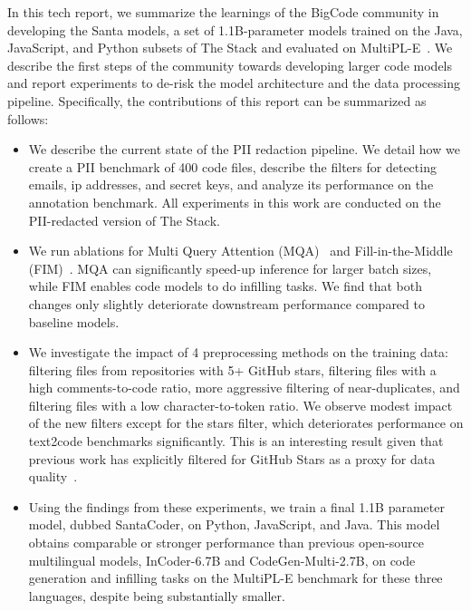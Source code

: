 \documentclass[10pt]{article} \usepackage{iclr2023_conference,times}
\begin{document}
In this tech report, we summarize the learnings of the BigCode community in developing the Santa models, a set of 1.1B-parameter models trained on the Java, JavaScript, and Python subsets of The Stack and evaluated on MultiPL-E~\citep{cassano2022multiple}. We describe the first steps of the community towards developing larger code models and report experiments to de-risk the model architecture and the data processing pipeline. Specifically, the contributions of this report can be summarized as follows:
\begin{itemize}
    \item We describe the current state of the PII redaction pipeline. We detail how we create a PII benchmark of 400 code files, describe the filters for detecting emails, ip addresses, and secret keys, and analyze its performance on the annotation benchmark. All experiments in this work are conducted on the PII-redacted version of The Stack.  
    \item We run ablations for Multi Query Attention (MQA)~\citep{shazeer2019mqa,chowdhery2022palm,li2022competition} and Fill-in-the-Middle (FIM)~\citep{fried2022incoder,bavarian2022fim}. MQA can significantly speed-up inference for larger batch sizes, while FIM enables code models to do infilling tasks. We find that both changes only slightly deteriorate downstream performance compared to baseline models. 
    \item We investigate the impact of 4 preprocessing methods on the training data: filtering files from repositories with 5+ GitHub stars, filtering files with a high comments-to-code ratio, more aggressive filtering of near-duplicates, and filtering files with a low character-to-token ratio. We observe modest impact of the new filters except for the stars filter, which deteriorates performance on text2code benchmarks significantly. This is an interesting result given that previous work has explicitly filtered for GitHub Stars as a proxy for data quality~\citep{gao2020pile,xu2022systematicevaluation}. 
    \item Using the findings from these experiments, we train a final 1.1B parameter model, dubbed SantaCoder, on Python, JavaScript, and Java. This model obtains comparable or stronger performance than previous open-source multilingual models, InCoder-6.7B and CodeGen-Multi-2.7B, on code generation and infilling tasks on the MultiPL-E benchmark for these three languages, despite being substantially smaller.
\end{itemize}
\end{document}
